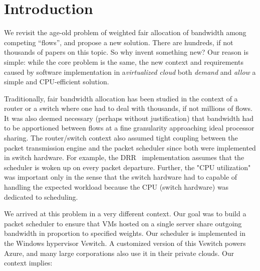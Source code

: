 \section {Introduction}

We revisit the age-old problem of weighted fair allocation of
bandwidth among competing ``flows'', and propose a new solution.  There are
hundreds, if not thousands of papers on this topic. So why 
invent something new?  Our reason is simple: while the core problem is the
same, the new context and requirements caused by software 
implementation in a{\em virtualized cloud} both {\em demand} 
and {\em allow} a simple and CPU-efficient solution. 

Traditionally, fair bandwidth allocation has been studied in the
context of a router or a switch where one had to deal with
thousands, if not millions of flows. It was also deemed necessary (perhaps
without justification) that bandwidth had to be apportioned between 
flows at a fine granularity approaching ideal processor sharing. The router/switch context 
also assumed tight coupling between the packet transmission engine and the
packet scheduler since both were implemented in switch hardware.  For example, the
DRR~\cite{drr} implementation assumes that the scheduler is woken up on every
packet departure. Further, the "CPU utilization" was important only in the
sense that the switch hardware had to capable of handling the expected workload
because the CPU (switch hardware) was dedicated to scheduling.

We arrived at this problem in a very different context. Our goal was to build a
packet scheduler to ensure that VMs hosted on a single server share outgoing
bandwidth in proportion to specified weights. Our scheduler is implemented in the Windows
hypervisor Vswitch. A customized version of this Vswitch powers Azure, and many
large corporations also use it in their private clouds. Our context implies:

